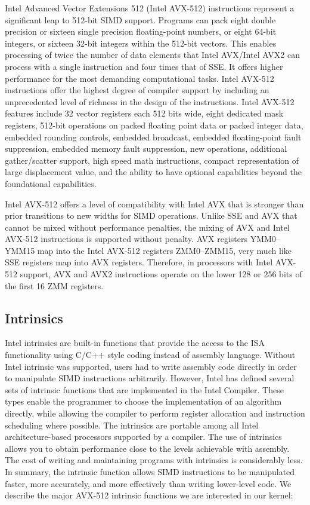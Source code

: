 \documentclass[sigconf]{acmart}
\begin{document}
Intel Advanced Vector Extensions 512 (Intel AVX-512) instructions
represent a significant leap to 512-bit SIMD support.
Programs can pack eight double precision or sixteen single precision floating-point numbers,
or eight 64-bit integers, or sixteen 32-bit integers within the 512-bit vectors.
This enables processing of twice the number of data elements that Intel AVX/Intel AVX2 can
process with a single instruction and four times that of SSE.
It offers higher performance for the most demanding computational tasks.
Intel AVX-512 instructions offer the highest degree of compiler support by including an
unprecedented level of richness in the design of the instructions.
Intel AVX-512 features include 32 vector registers each 512 bits wide, eight dedicated mask registers,
512-bit operations on packed floating point data or packed integer data, embedded rounding controls,
embedded broadcast, embedded floating-point fault suppression, embedded memory fault suppression, new operations,
additional gather/scatter support, high speed math instructions, compact representation of
large displacement value, and the ability to have optional capabilities beyond the foundational
capabilities.

Intel AVX-512 offers a level of compatibility with Intel AVX that is stronger than
prior transitions to new widths for SIMD operations. Unlike SSE and AVX that cannot
be mixed without performance penalties, the mixing of AVX and Intel AVX-512 instructions
is supported without penalty. AVX registers YMM0–YMM15 map into the Intel AVX-512 registers
ZMM0–ZMM15, very much like SSE registers map into AVX registers. Therefore, in processors with
Intel AVX-512 support, AVX and AVX2 instructions operate on the lower 128 or 256 bits of the first 16 ZMM registers.

\subsection{Intrinsics}
Intel intrinsics are built-in functions
that provide the access to the ISA functionality using C/C++ style coding instead of assembly
language. Without Intel intrinsic was supported, users had to
write assembly code directly in order to manipulate SIMD
instructions arbitrarily.
However, Intel has defined several sets of intrinsic functions that are implemented in the Intel
Compiler. These types enable the programmer to choose the implementation
of an algorithm directly, while allowing the compiler to perform register allocation and instruction
scheduling where possible. The intrinsics are portable among all Intel architecture-based processors supported
by a compiler. The use of intrinsics allows you to obtain performance close to the levels achievable with assembly.
The cost of writing and maintaining programs with intrinsics is considerably less.
In summary, the intrinsic function
allows SIMD instructions to be manipulated faster, more
accurately, and more effectively than writing lower-level code.
We describe the major AVX-512 intrinsic functions we are interested in our kernel:
\end{document}
